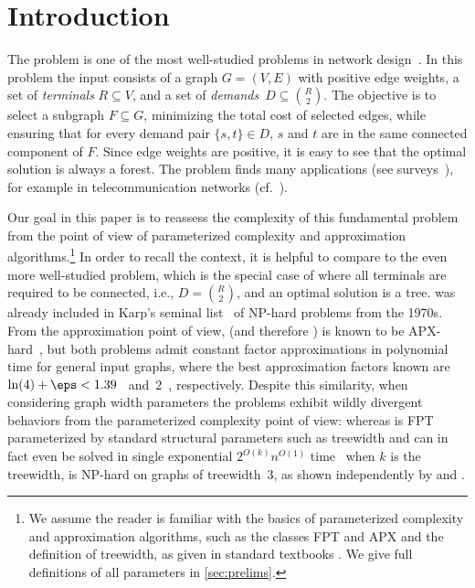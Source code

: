 \section{Introduction}

The \SF problem is one of the most well-studied problems in network
design~\cite{ljubic2021solving, hwang1992steiner, du2013advances,
gupta2011approximation}. In this problem the input consists of a graph
$G=(V,E)$ with positive edge weights, %
a set of \emph{terminals} $R\subseteq V$, and a set of
\emph{demands}~$D\subseteq\binom{R}{2}$. The objective is to select a subgraph
$F\subseteq G$, minimizing the total cost of selected edges, while ensuring that for every
demand pair $\{s,t\}\in D$, $s$ and $t$ are in the same connected component of
$F$.  Since edge weights are positive, it is easy to see that the optimal
solution is always a forest. The \SF problem finds many applications (see
surveys~\cite{ljubic2021solving, cheng2013steiner, voss2006steiner,
tang2020survey}), for example in telecommunication networks
(cf.~\cite{voss2006steiner}). 

Our goal in this paper is to reassess the complexity of this fundamental problem
from the point of view of parameterized complexity and approximation
algorithms.\footnote{We assume the reader is familiar with the
basics of parameterized complexity and approximation algorithms, such as the classes FPT and APX
and the definition of treewidth, as given in standard textbooks 
\cite{cygan2015parameterized,williamson2011design,feldmann2020survey}. 
We give full definitions of all parameters in \cref{sec:prelims}.}
In order to recall the context, it is helpful to compare \SF to the
even more well-studied \ST problem, which is the special case of \SF where all
terminals are required to be connected, i.e., $D=\binom{R}{2}$, and an optimal
solution is a tree. \ST was already included in Karp's seminal
list~\cite{karp1975computational} of NP-hard problems from the 1970s. From the
approximation point of view, \ST (and therefore \SF) is known to be
APX-hard~\cite{chlebik2008steiner}, but both problems admit constant factor
approximations in polynomial time for general input graphs, where the best
approximation factors known are~$\ln(4)+\eps<1.39$~\cite{byrka2013steiner}
and~$2$~\cite{agrawal1991trees, ravi1994primal}, respectively. Despite this
similarity, when considering graph width parameters the problems exhibit 
wildly divergent behaviors from the parameterized complexity point of
view: whereas \ST is FPT parameterized by standard structural parameters such
as treewidth and can in fact even be solved in single exponential
$2^{O(k)}n^{O(1)}$ time~\cite{bodlaender2015deterministic} when $k$ is the
treewidth, \SF is NP-hard on graphs of treewidth~$3$, as shown independently by
\citet{gassner2010steiner} and \citet{bateni2011approximation}.

